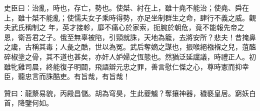 \begin{pinyinscope}
 史臣曰：治亂，時也，存亡，勢也。使桀、紂在上，雖十堯不能治；使堯、舜在上，雖十桀不能亂；使懦夫女子乘時得勢，亦足坐制群生之命，肆行不義之威。觀夫武氏稱制之
 年，英才接軫，靡不痛心於家索，扼腕於朝危，竟不能報先帝之恩，衛吾君之子。俄至無辜被陷，引頸就誅，天地為籠，去將安所？悲夫！昔掩鼻之讒，古稱其毒；人彘之酷，世以為冤。武后奪嫡之謀也，振喉絕襁褓之兒，菹醢碎椒塗之骨，其不道也甚矣，亦奸人妒婦之恆態也。然猶泛延讜議，時禮正人。初雖牝雞司晨，終能復子明闢，飛語辯元忠之罪，善言慰仁傑之心，尊時憲而抑幸臣，聽忠言而誅酷吏。有旨哉，有旨哉！



 贊曰：龍漦易貌，丙殿昌儲。胡為穹昊，生此夔魖？奪攘神器，穢褻皇居。窮妖白首，降鑒何如。



\end{pinyinscope}